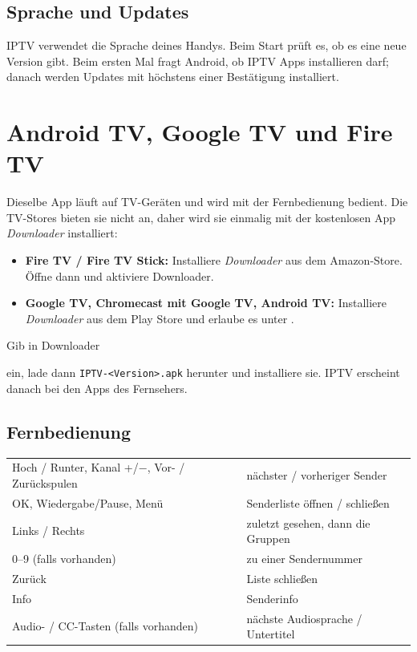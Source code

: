 \subsection{Sprache und Updates}
IPTV verwendet die Sprache deines Handys. Beim Start prüft es, ob es eine
neue Version gibt. Beim ersten Mal fragt Android, ob IPTV Apps installieren
darf; danach werden Updates mit höchstens einer Bestätigung installiert.

\section{Android TV, Google TV und Fire TV}

Dieselbe App läuft auf TV-Geräten und wird mit der Fernbedienung bedient. Die
TV-Stores bieten sie nicht an, daher wird sie einmalig mit der kostenlosen
App \emph{Downloader} installiert:

\begin{itemize}
  \item \textbf{Fire TV / Fire TV Stick:} Installiere \emph{Downloader} aus
        dem Amazon-Store. Öffne dann  und aktiviere Downloader.
  \item \textbf{Google TV, Chromecast mit Google TV, Android TV:} Installiere
        \emph{Downloader} aus dem Play Store und erlaube es unter
        .
\end{itemize}
Gib in Downloader
\begin{center}
  \download
\end{center}
ein, lade dann \texttt{IPTV-\textless Version\textgreater.apk} herunter und
installiere sie. IPTV erscheint danach bei den Apps des Fernsehers.

\subsection{Fernbedienung}
\begin{xltabular}{\linewidth}{@{}KX@{}}
Hoch / Runter, Kanal +/$-$, Vor- / Zurückspulen & nächster / vorheriger Sender \\
OK, Wiedergabe/Pause, Menü & Senderliste öffnen / schließen \\
Links / Rechts & zuletzt gesehen, dann die Gruppen \\
0--9 (falls vorhanden) & zu einer Sendernummer \\
Zurück & Liste schließen \\
Info & Senderinfo \\
Audio- / CC-Tasten (falls vorhanden) & nächste Audiosprache / Untertitel \\
\bottomrule
\end{xltabular}

